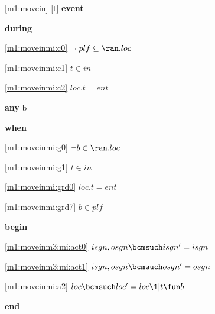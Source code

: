 \noindent \ref{m1:movein} [t] \textbf{event}
\begin{block}
  \item   \textbf{during}
  \begin{block}
  \item[ \eqref{m1:moveinmi:c0} ]$\neg ~ plf \subseteq \ran.loc $ %
  \item[ \eqref{m1:moveinmi:c1} ]$t \in in $ %
  \item[ \eqref{m1:moveinmi:c2} ]$loc.t = ent $ %
  \end{block}
  \item   \textbf{any} b
  \item   \textbf{when}
  \begin{block}
  \item[ \eqref{m1:moveinmi:g0} ]$\neg b \in \ran.loc  	$ %
  \item[ \eqref{m1:moveinmi:g1} ]$t \in in $ %
  \item[ \eqref{m1:moveinmi:grd0} ]$loc.t = ent $ %
  \item[ \eqref{m1:moveinmi:grd7} ]$b \in plf $ %
  \end{block}
  \item   \textbf{begin}
  \begin{block}
  \item[ \eqref{m1:moveinm3:mi:act0} ]$isgn,osgn \bcmsuch isgn' = isgn$ %
  \item[ \eqref{m1:moveinm3:mi:act1} ]$isgn,osgn \bcmsuch osgn' = osgn$ %
  \item[ \eqref{m1:moveinmi:a2} ]$loc \bcmsuch loc' = loc \1| t \fun b $ %
  \end{block}
  \item   \textbf{end} \\
\end{block}

